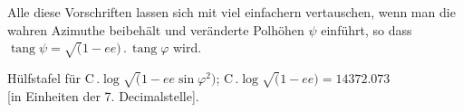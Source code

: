 \par\clearpage
\noindent\makebox[12mm][l]{}\par\medskip

Alle diese Vorschriften lassen sich mit viel einfachern vertauschen,
wenn man die wahren Azimuthe beibehält und veränderte Polhöhen \(\psi\) einführt,
so dass \(\operatorname{tang}\psi=\surd(1-ee)\,.\,\operatorname{tang}\varphi\) wird.

\begin{center}
Hülfstafel für \(\mathrm C\,.\log\surd(1-ee\sin\varphi^2)\);
\(\mathrm C\,.\log\surd(1-ee)=14372.073\)\\
{[in Einheiten der 7. Decimalstelle].}
\end{center}


